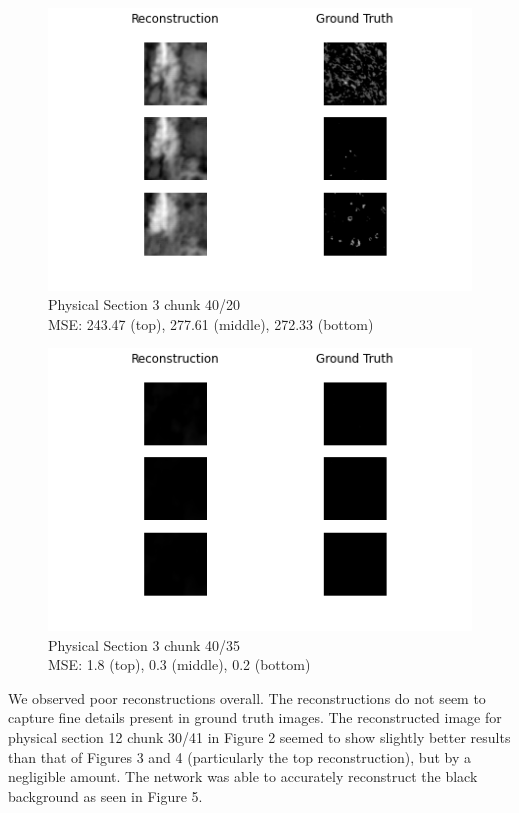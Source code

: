 \documentclass[10pt,twocolumn,letterpaper]{article}
\begin{document}
\begin{figure}[!h]
	\centering
	\captionsetup{justification=centering}
		\hspace*{-1cm}	
		\includegraphics[scale=0.65]{../figures/3_40_20.png}
	\caption{Physical Section 3 chunk 40/20\\ MSE: 243.47 (top), 277.61 (middle), 272.33 (bottom)}		
\end{figure}

\vspace*{0.05cm}

\begin{figure}[!h]
	\centering
	\captionsetup{justification=centering}
		\hspace*{-1cm}	
		\includegraphics[scale=0.65]{../figures/10_40_35.png}
	\caption{Physical Section 3 chunk 40/35\\ MSE: 1.8 (top), 0.3 (middle), 0.2 (bottom)}		
\end{figure}

We observed poor reconstructions overall. The reconstructions do not seem to capture fine details present in ground truth images. The reconstructed image for physical section 12 chunk 30/41 in Figure 2 seemed to show slightly better results than that of Figures 3 and 4 (particularly the top reconstruction), but by a negligible amount. The network was able to accurately reconstruct the black background as seen in Figure 5.
\end{document}
